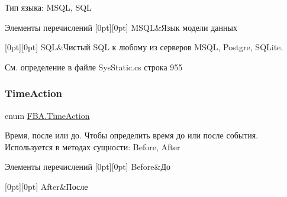 Тип языка\+: M\+S\+QL, S\+QL 

\begin{DoxyEnumFields}{Элементы перечислений}
[0pt][0pt]{}\mbox{\label{namespace_f_b_a_aa7137ed2c5f5027f13bb403ffc2b005ea0c1afcca37c20f3ebb923a15752dd1c1}} 
M\+S\+QL&Язык модели данных \\
\hline

[0pt][0pt]{}\mbox{\label{namespace_f_b_a_aa7137ed2c5f5027f13bb403ffc2b005ea9778840a0100cb30c982876741b0b5a2}} 
S\+QL&Чистый S\+QL к любому из серверов M\+S\+QL, Postgre, S\+Q\+Lite. \\
\hline

\end{DoxyEnumFields}


См. определение в файле Sys\+Static.\+cs строка 955

\mbox{\label{namespace_f_b_a_a8f6da5d8d2dd8766bfe9052175a21970}} 
\subsubsection{\texorpdfstring{Time\+Action}{TimeAction}}
{\footnotesize\ttfamily enum \mbox{\hyperlink{namespace_f_b_a_a8f6da5d8d2dd8766bfe9052175a21970}{F\+B\+A.\+Time\+Action}}\hspace{0.3cm}{\ttfamily [strong]}}



Время, после или до. Чтобы определить время до или после события. Используется в методах сущности\+: Before, After 

\begin{DoxyEnumFields}{Элементы перечислений}
[0pt][0pt]{}\mbox{\label{namespace_f_b_a_a8f6da5d8d2dd8766bfe9052175a21970a9060587edeb01a63e3d3edc959678d1e}} 
Before&До \\
\hline

[0pt][0pt]{}\mbox{\label{namespace_f_b_a_a8f6da5d8d2dd8766bfe9052175a21970a7bfcadb5535fe8aad5032762b7bfe159}} 
After&После \\
\hline

\end{DoxyEnumFields}


